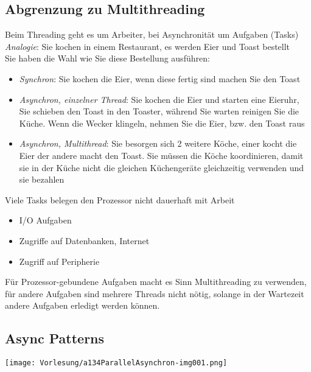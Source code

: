 \subsection{Abgrenzung zu Multithreading}
Beim Threading geht es um Arbeiter, bei Asynchronität um Aufgaben (Tasks)\bigskip\\
\emph{Analogie}: Sie kochen in einem Restaurant, es werden Eier und Toast bestellt\\
Sie haben die Wahl wie Sie diese Bestellung ausführen:
\begin{itemize}
\item \emph{Synchron}: Sie kochen die Eier, wenn diese fertig sind machen Sie den Toast
\item \emph{Asynchron, einzelner Thread}: Sie kochen die Eier und starten eine Eieruhr, Sie schieben den Toast in den Toaster, während Sie warten reinigen Sie die Küche. Wenn die Wecker klingeln, nehmen Sie die Eier, bzw. den Toast raus
\item \emph{Asynchron, Multithread}: Sie besorgen sich 2 weitere Köche, einer kocht die Eier der andere macht den Toast. Sie müssen die Köche koordinieren, damit sie in der Küche nicht die gleichen Küchengeräte gleichzeitig verwenden und sie bezahlen
\end{itemize}
Viele Tasks belegen den Prozessor nicht dauerhaft mit Arbeit
\begin{itemize}
\item I/O Aufgaben
\item Zugriffe auf Datenbanken, Internet
\item Zugriff auf Peripherie
\end{itemize}
Für Prozessor-gebundene Aufgaben macht es Sinn Multithreading zu verwenden, für andere Aufgaben sind mehrere Threads nicht nötig, solange in der Wartezeit andere Aufgaben erledigt werden können.

\subsection{Async Patterns}
\begin{center}
	\texttt{[image: Vorlesung/a134ParallelAsynchron-img001.png]} 
\end{center}
